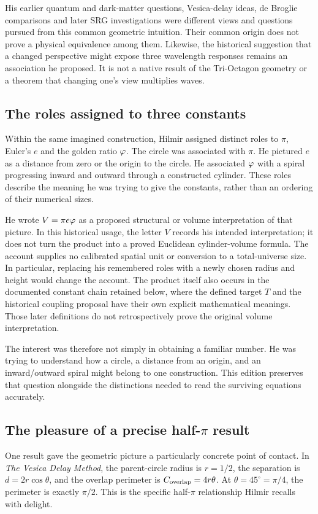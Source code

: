 His earlier quantum and dark-matter questions, Vesica-delay ideas, de Broglie comparisons and later SRG investigations were different views and questions pursued from this common geometric intuition. Their common origin does not prove a physical equivalence among them. Likewise, the historical suggestion that a changed perspective might expose three wavelength responses remains an association he proposed. It is not a native result of the Tri-Octagon geometry or a theorem that changing one's view multiplies waves.

\subsection*{The roles assigned to three constants}
Within the same imagined construction, Hilmir assigned distinct roles to $\pi$, Euler's $e$ and the golden ratio $\varphi$. The circle was associated with $\pi$. He pictured $e$ as a distance from zero or the origin to the circle. He associated $\varphi$ with a spiral progressing inward and outward through a constructed cylinder. These roles describe the meaning he was trying to give the constants, rather than an ordering of their numerical sizes.

He wrote $V=\pi e\varphi$ as a proposed structural or volume interpretation of that picture. In this historical usage, the letter $V$ records his intended interpretation; it does not turn the product into a proved Euclidean cylinder-volume formula. The account supplies no calibrated spatial unit or conversion to a total-universe size. In particular, replacing his remembered roles with a newly chosen radius and height would change the account. The product itself also occurs in the documented constant chain retained below, where the defined target $T$ and the historical coupling proposal have their own explicit mathematical meanings. Those later definitions do not retrospectively prove the original volume interpretation.

The interest was therefore not simply in obtaining a familiar number. He was trying to understand how a circle, a distance from an origin, and an inward/outward spiral might belong to one construction. This edition preserves that question alongside the distinctions needed to read the surviving equations accurately.

\subsection*{The pleasure of a precise half-$\pi$ result}
One result gave the geometric picture a particularly concrete point of contact. In \emph{The Vesica Delay Method}, the parent-circle radius is $r=1/2$, the separation is $d=2r\cos\theta$, and the overlap perimeter is $C_{\rm overlap}=4r\theta$. At $\theta=45^\circ=\pi/4$, the perimeter is exactly $\pi/2$. This is the specific half-$\pi$ relationship Hilmir recalls with delight.~\cite{Delay,History26}

